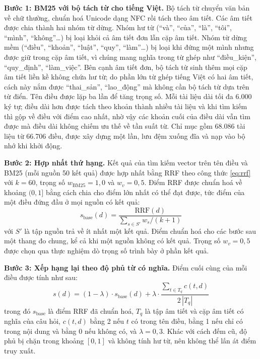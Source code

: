 \documentclass[../DoAn.tex]{subfiles}
\begin{document}
\textbf{Bước 1: BM25 với bộ tách từ cho tiếng Việt.} Bộ tách từ chuyển văn bản về chữ thường, chuẩn hoá Unicode dạng NFC rồi tách theo âm tiết. Các âm tiết được chia thành hai nhóm từ dừng. Nhóm hư từ (``và'', ``của'', ``là'', ``tôi'', ``mình'', ``không''\ldots) bị loại khỏi cả âm tiết đơn lẫn cặp âm tiết. Nhóm từ dừng mềm (``điều'', ``khoản'', ``luật'', ``quy'', ``làm''\ldots) bị loại khi đứng một mình nhưng được giữ trong cặp âm tiết, vì chúng mang nghĩa trong từ ghép như ``điều\_kiện'', ``quy\_định'', ``làm\_việc''. Bên cạnh âm tiết đơn, bộ tách từ sinh thêm mọi cặp âm tiết liền kề không chứa hư từ; do phần lớn từ ghép tiếng Việt có hai âm tiết, cách này nắm được ``thai\_sản'', ``lao\_động'' mà không cần bộ tách từ dựa trên từ điển. Tên điều được lặp ba lần để tăng trọng số. Mỗi tài liệu dài tối đa 6.000 ký tự; điều dài hơn được tách theo khoản thành nhiều tài liệu và khi tìm kiếm thì gộp về điều với điểm cao nhất, nhờ vậy các khoản cuối của điều dài vẫn tìm được mà điều dài không chiếm ưu thế về tần suất từ. Chỉ mục gồm 68.086 tài liệu từ 66.706 điều, được xây dựng một lần, lưu đệm xuống đĩa và nạp vào bộ nhớ khi khởi động.

\textbf{Bước 2: Hợp nhất thứ hạng.} Kết quả của tìm kiếm vector trên tên điều và BM25 (mỗi nguồn 50 kết quả) được hợp nhất bằng RRF theo công thức \eqref{eq:rrf} với $k = 60$, trọng số $w_{\mathrm{BM25}} = 1{,}0$ và $w_{v} = 0{,}5$. Điểm RRF được chuẩn hoá về khoảng $(0, 1]$ bằng cách chia cho điểm lớn nhất có thể đạt được, tức điểm của một điều đứng đầu ở mọi nguồn có kết quả:
\begin{equation}\label{eq:rrfnorm}
    s_{\mathrm{base}}(d) = \frac{\mathrm{RRF}(d)}{\sum_{s \in S'} w_s / (k + 1)}
\end{equation}
với $S'$ là tập nguồn trả về ít nhất một kết quả. Điểm chuẩn hoá cho các bước sau một thang đo chung, kể cả khi một nguồn không có kết quả. Trọng số $w_{v} = 0{,}5$ được chọn qua thực nghiệm dò trọng số trình bày ở phần kết quả.

\textbf{Bước 3: Xếp hạng lại theo độ phủ từ có nghĩa.} Điểm cuối cùng của mỗi điều được tính như sau:
\begin{equation}\label{eq:rerank}
    s(d) = (1-\lambda)\cdot s_{\mathrm{base}}(d) + \lambda\cdot \frac{\sum_{t \in T_q} c(t, d)}{2\,|T_q|}
\end{equation}
trong đó $s_{\mathrm{base}}$ là điểm RRF đã chuẩn hoá, $T_q$ là tập âm tiết và cặp âm tiết có nghĩa của câu hỏi, $c(t,d)$ bằng 2 nếu $t$ có trong tên điều, bằng 1 nếu chỉ có trong nội dung và bằng 0 nếu không có, và $\lambda = 0{,}3$. Khác với cách đếm cũ, độ phủ bị chặn trong khoảng $[0, 1]$ và không tính hư từ, nên không thể lấn át điểm truy xuất.
\end{document}
